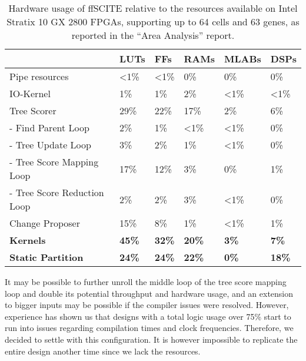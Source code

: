 \begin{table}
    \centering
    \begin{tabular}{l|l|l|l|l|l}
        &                               \textbf{LUTs}&  \textbf{FFs} &  \textbf{RAMs} & \textbf{MLABs} &    \textbf{DSPs} \\
        \hline
        Pipe resources &                <1\% &          <1\% &          0\% &           0\% &               0\%	\\
        IO-Kernel &                     1\% &           1\% &           2\% &           <1\% &              <1\% \\
        Tree Scorer &                   29\% &          22\% &          17\% &          2\% &               6\% \\
        - Find Parent Loop &            2\% &           1\% &           <1\% &          <1\% &              0\% \\
        - Tree Update Loop &            3\% &           2\% &           1\% &           <1\% &              0\% \\
        - Tree Score Mapping Loop &     17\% &          12\% &          3\% &           0\% &               1\% \\
        - Tree Score Reduction Loop&    2\% &           2\% &           3\% &           <1\% &              0\% \\
        Change Proposer &               15\% &          8\% &           1\% &           <1\% &              1\% \\
        \hline
        \textbf{Kernels} &              \textbf{45\%} & \textbf{32\%} & \textbf{20\%} & \textbf{3\%} &      \textbf{7\%} \\
        \textbf{Static Partition} &     \textbf{24\%}&  \textbf{24\%} & \textbf{22\%} & \textbf{0\%} &      \textbf{18\%}	
    \end{tabular}
    \caption{Hardware usage of \ac{ffSCITE} relative to the resources available on Intel Stratix 10 GX 2800 \acp{FPGA}, supporting up to 64 cells and 63 genes, as reported in the ``Area Analysis'' report.}
    \label{tab:rel-usage}
\end{table}

It may be possible to further unroll the middle loop of the tree score mapping loop and double its potential throughput and hardware usage, and an extension to bigger inputs may be possible if the compiler issues were resolved. However, experience has shown us that designs with a total logic usage over 75\% start to run into issues regarding compilation times and clock frequencies. Therefore, we decided to settle with this configuration. It is however impossible to replicate the entire design another time since we lack the resources.

